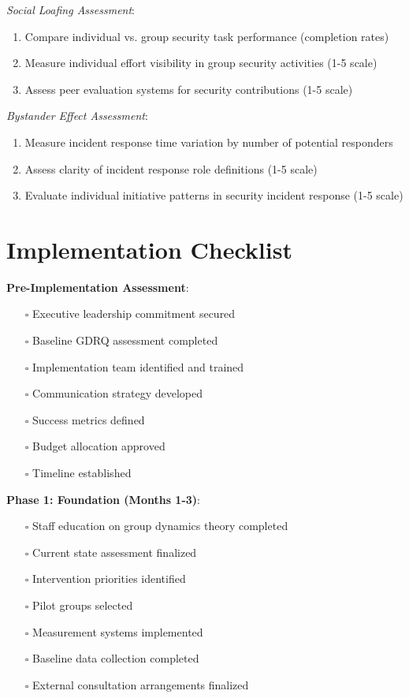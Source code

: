 \documentclass[11pt,a4paper]{article}
\begin{document}
\textit{Social Loafing Assessment}:
\begin{enumerate}
\item Compare individual vs. group security task performance (completion rates)
\item Measure individual effort visibility in group security activities (1-5 scale)
\item Assess peer evaluation systems for security contributions (1-5 scale)
\end{enumerate}

\textit{Bystander Effect Assessment}:
\begin{enumerate}
\item Measure incident response time variation by number of potential responders
\item Assess clarity of incident response role definitions (1-5 scale)
\item Evaluate individual initiative patterns in security incident response (1-5 scale)
\end{enumerate}

\section{Implementation Checklist}
\label{app:implementation_checklist}

\textbf{Pre-Implementation Assessment}:
\begin{itemize}
\item[$\square$] Executive leadership commitment secured
\item[$\square$] Baseline GDRQ assessment completed
\item[$\square$] Implementation team identified and trained
\item[$\square$] Communication strategy developed
\item[$\square$] Success metrics defined
\item[$\square$] Budget allocation approved
\item[$\square$] Timeline established
\end{itemize}

\textbf{Phase 1: Foundation (Months 1-3)}:
\begin{itemize}
\item[$\square$] Staff education on group dynamics theory completed
\item[$\square$] Current state assessment finalized
\item[$\square$] Intervention priorities identified
\item[$\square$] Pilot groups selected
\item[$\square$] Measurement systems implemented
\item[$\square$] Baseline data collection completed
\item[$\square$] External consultation arrangements finalized
\end{itemize}
\end{document}
